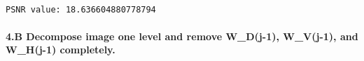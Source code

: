 \documentclass[11pt]{article}
\begin{document}
    \begin{center}
    \end{center}
    { \hspace*{\fill} \\}
    
    \begin{Verbatim}[commandchars=\\\{\}]
PSNR value: 18.636604880778794

    \end{Verbatim}

    \hypertarget{b-decompose-image-one-level-and-remove-w_dj-1-w_vj-1-and-w_hj-1-completely.}{%
\paragraph{4.B Decompose image one level and remove W\_D(j-1),
W\_V(j-1), and W\_H(j-1)
completely.}\label{b-decompose-image-one-level-and-remove-w_dj-1-w_vj-1-and-w_hj-1-completely.}}
\end{document}
